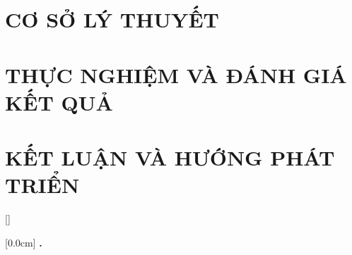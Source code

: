 \documentclass[a4paper,13pt,3p,twoside]{report}
\renewcommand{\bibname}{Danh_sach_tai_lieu_tham_khao}
\theoremstyle{definition}
\begin{document}
\newpage
\chapter{CƠ SỞ LÝ THUYẾT}
\label{chapter:Related_works}


\newpage
\chapter{THỰC NGHIỆM VÀ ĐÁNH GIÁ KẾT QUẢ} %
\label{chapter:Experiment}


\newpage
\chapter{KẾT LUẬN VÀ HƯỚNG PHÁT TRIỂN} %
\label{chapter:conclusion}


\newpage
% 


\newpage
\renewcommand\bibname{TÀI LIỆU THAM KHẢO}
\printbibliography
{}



{}[]
\titlespacing*{\chapter}{0pt}{-20pt}{20pt}

    [0.0cm]             %
    {\bfseries\vspace{0.3cm}}                  %
    {{\bfseries{\scshape} \thecontentslabel.\ }} %
    {}         %
    {\contentspage}         %
% 
\newpage
\end{document}
